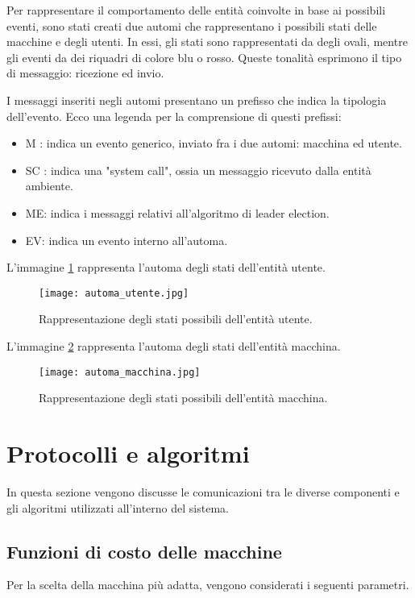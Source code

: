 Per rappresentare il comportamento delle entità coinvolte in base ai possibili eventi, sono stati creati due automi che rappresentano i possibili stati delle macchine e degli utenti. In essi, gli stati sono rappresentati da degli ovali, mentre gli eventi da dei riquadri di colore blu o rosso. Queste tonalità esprimono il tipo di messaggio: ricezione ed invio.

I  messaggi inseriti negli automi presentano un prefisso che indica la tipologia dell'evento. Ecco una legenda per la comprensione di questi prefissi:
\begin{itemize}
	\item M : indica un evento generico, inviato fra i due automi: macchina ed utente.
	\item SC : indica una "system call", ossia un messaggio ricevuto dalla entità ambiente.
	\item ME: indica i messaggi relativi all'algoritmo di leader election.
	\item EV: indica un evento interno all'automa.
\end{itemize}


L'immagine \ref{fig:automa_utente} rappresenta l'automa degli stati dell'entità utente.

\begin{figure}[htbp]
	\centering
	\texttt{[image: automa\_utente.jpg]}
	\caption{Rappresentazione degli stati possibili dell'entità utente.}
	\label{fig:automa_utente}
\end{figure}

L'immagine \ref{fig:automa_macchina} rappresenta l'automa degli stati dell'entità macchina.


\begin{figure}[htbp]
	\centering
	\texttt{[image: automa\_macchina.jpg]}
	\caption{Rappresentazione degli stati possibili dell'entità macchina.}
	\label{fig:automa_macchina}
\end{figure}

\newpage

\section{Protocolli e algoritmi}
In questa sezione vengono discusse le comunicazioni tra le diverse componenti e gli algoritmi utilizzati all'interno del sistema.

\subsection{Funzioni di costo delle macchine} \label{funzioni_di_costo_macchine}
Per la scelta della macchina più adatta, vengono considerati i seguenti parametri.


